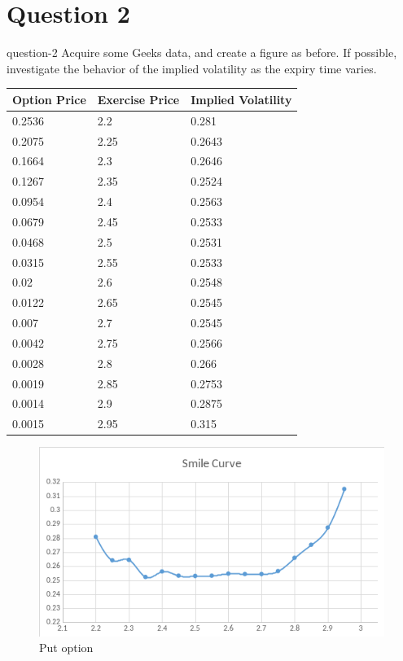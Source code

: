 \section{Question 2}
\begin{statebox}{}{question-2}
    Acquire some Geeks data, and create a figure as before. If possible, investigate the behavior of the implied volatility as the expiry time varies.
\end{statebox}
% 
\begin{table}[H]
    \begin{tabular}{@{}lll@{}}
    \toprule
    Option Price & Exercise Price & Implied Volatility \\ \midrule
    0.2536       & 2.2            & 0.281              \\
    0.2075       & 2.25           & 0.2643             \\
    0.1664       & 2.3            & 0.2646             \\
    0.1267       & 2.35           & 0.2524             \\
    0.0954       & 2.4            & 0.2563             \\
    0.0679       & 2.45           & 0.2533             \\
    0.0468       & 2.5            & 0.2531             \\
    0.0315       & 2.55           & 0.2533             \\
    0.02         & 2.6            & 0.2548             \\
    0.0122       & 2.65           & 0.2545             \\
    0.007        & 2.7            & 0.2545             \\
    0.0042       & 2.75           & 0.2566             \\
    0.0028       & 2.8            & 0.266              \\
    0.0019       & 2.85           & 0.2753             \\
    0.0014       & 2.9            & 0.2875             \\
    0.0015       & 2.95           & 0.315              \\ \bottomrule
    \end{tabular}
\end{table}
\begin{figure}[H]
    \centering
    \includegraphics[width=.7\textwidth]{figures/2019-12-04-smile.png}
    \caption{Put option}\label{F:1}
\end{figure}
